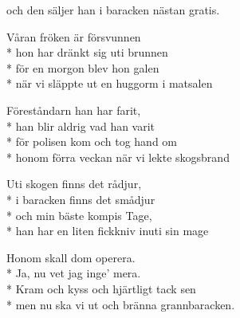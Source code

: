 \begin{SongText}
\begin{SongVerse}
        och den säljer han i baracken nästan gratis.
    \end{SongVerse}
    \begin{SongVerse}
        Våran fröken är försvunnen\\*%
        hon har dränkt sig uti brunnen\\*%
        för en morgon blev hon galen\\*%
        när vi släppte ut en huggorm i matsalen
    \end{SongVerse}
    \begin{SongVerse}
        Föreståndarn han har farit,\\*%
        han blir aldrig vad han varit\\*%
        för polisen kom och tog hand om\\*%
        honom förra veckan när vi lekte skogsbrand
    \end{SongVerse}
    \begin{SongVerse}
        Uti skogen finns det rådjur,\\*%
        i baracken finns det smådjur\\*%
        och min bäste kompis Tage,\\*%
        han har en liten fickkniv inuti sin mage
    \end{SongVerse}
    \begin{SongVerse}
        Honom skall dom operera.\\*%
        Ja, nu vet jag inge’ mera.\\*%
        Kram och kyss och hjärtligt tack sen\\*%
        men nu ska vi ut och bränna grannbaracken.
    \end{SongVerse}
\end{SongText}
